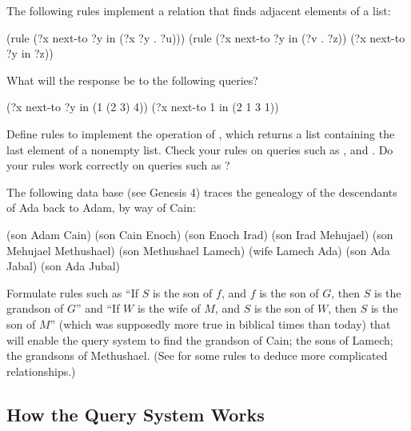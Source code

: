 \begin{exerciseGroup}
\label{Exercise 4.61}
 The following rules implement a
 relation that finds adjacent elements of a list:

\begin{codeBlock}
(rule (?x next-to ?y in (?x ?y . ?u)))
(rule (?x next-to ?y in (?v . ?z))
      (?x next-to ?y in ?z))
\end{codeBlock}

What will the response be to the following queries?

\begin{codeBlock}
(?x next-to ?y in (1 (2 3) 4))
(?x next-to  1 in (2 1 3 1))
\end{codeBlock}

\label{Exercise 4.62}
 Define rules to implement the
 operation of , which returns a list
containing the last element of a nonempty list.  Check your rules on queries
such as ,  and
.  Do your rules work correctly on queries such as
 ?

\label{Exercise 4.63}
 The following data base (see
Genesis 4) traces the genealogy of the descendants of Ada back to Adam, by way
of Cain:

\begin{codeBlock}
(son Adam Cain)
(son Cain Enoch)
(son Enoch Irad)
(son Irad Mehujael)
(son Mehujael Methushael)
(son Methushael Lamech)
(wife Lamech Ada)
(son Ada Jabal)
(son Ada Jubal)
\end{codeBlock}

Formulate rules such as ``If \( S \) is the son of \( f \), and \( f \) is the son of
\( G \), then \( S \) is the grandson of \( G \)'' and ``If \( W \) is the wife of
\( M \), and \( S \) is the son of \( W \), then \( S \) is the son of \( M \)'' (which
was supposedly more true in biblical times than today) that will enable the
query system to find the grandson of Cain; the sons of Lamech; the grandsons of
Methushael.  (See  for some rules to deduce more complicated
relationships.)
\end{exerciseGroup}

\subsection{How the Query System Works}
\label{Section 4.4.2}

